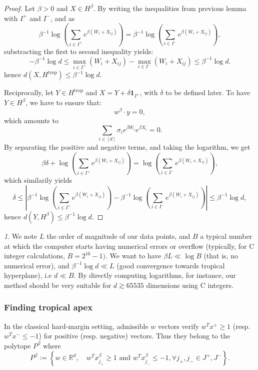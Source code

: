 \documentclass[oneside,english,a4paper]{amsart}
\numberwithin{equation}{section}
\numberwithin{figure}{section}
\theoremstyle{plain}
\theoremstyle{definition}
\theoremstyle{plain}
\theoremstyle{remark}
\newtheorem{rem}[thm]{\protect\remarkname}
\theoremstyle{plain}
\theoremstyle{definition}
\theoremstyle{definition}
\providecommand{\remarkname}{Remark}
\begin{document}
\begin{proof}
Let $\beta>0$ and $X\in H^{\beta}$. By writing the inequalities
from previous lemma with $I^{+}$ and $I^{-}$, and as $$\beta^{-1}\log\left(\sum_{i\in I^{+}}e^{\beta(W_{i}+X_{ij})}\right)=\beta^{-1}\log\left(\sum_{i\in I^{-}}e^{\beta(W_{i}+X_{ij})}\right),$$
substracting the first to second inequality yields: 
\[
-\beta^{-1}\log d\le\max_{i\in I^{+}}(W_{i}+X_{ij})-\max_{i\in I^{-}}(W_{i}+X_{ij})\le\beta^{-1}\log d.
\]
hence $d(X,H^{\text{trop}})\le\beta^{-1}\log d$.

Reciprocally, let $Y\in H^{\text{trop}}$ and $X=Y+\delta\mathbf{1}_{I^{+}}$,
with $\delta$ to be defined later. To have $Y\in H^{\beta}$, we
have to ensure that: 
\[
w^{\beta}\cdot y=0,
\]
which amounts to 
\[
\sum_{i\in[d]}\sigma_{i}e^{\beta W_{i}}e^{\beta X_{i}}=0.
\]
By separating the positive and negative terms, and taking the logarithm,
we get 
\[
\beta\delta+\log\left(\sum_{i\in I^{+}}e^{\beta(W_{i}+X_{ij})}\right)=\log\left(\sum_{i\in I^{-}}e^{\beta(W_{i}+X_{ij})}\right),
\]
which similarily yields 
\[
\delta\le\left|\beta^{-1}\log\left(\sum_{i\in I^{+}}e^{\beta(W_{i}+X_{ij})}\right)-\beta^{-1}\log\left(\sum_{i\in I^{-}}e^{\beta(W_{i}+X_{ij})}\right)\right|\le\beta^{-1}\log d,
\]
hence $d(Y,H^{\beta})\le\beta^{-1}\log d$. 
\end{proof}
\begin{rem}
We note $L$ the order of magnitude of our data points, and $B$ a
typical number at which the computer starts having numerical errors
or overflow (typically, for C integer calculations, $B=2^{16}-1)$.
We want to have $\beta L\ll\log B$ (that is, no numerical error),
and $\beta^{-1}\log d\ll L$ (good convergence towards tropical hyperplane),
i.e $d\ll B$. By directly computing logarithms, for instance, our
method should be very suitable for $d\apprge65535$ dimensions using
C integers. 
\end{rem}


\subsubsection{Finding tropical apex}

In the classical hard-margin setting, admissible $w$ vectors verify
$w^{T}x^{+}\ge1$ (resp. $w^{T}x^{-}\le-1$) for positive (resp. negative)
vectors. Thus they belong to the polytope $P^{\beta}$ where 
\[
P^{\beta}:=\left\{ w\in\mathbb{R}^{d},\quad w^{T}x_{j_{+}}^{\beta}\ge1\text{ and }w^{T}x_{j_{-}}^{\beta}\le-1,\forall j_{+},j_{-}\in J^{+},J^{-}\right\} .
\]
\end{document}
